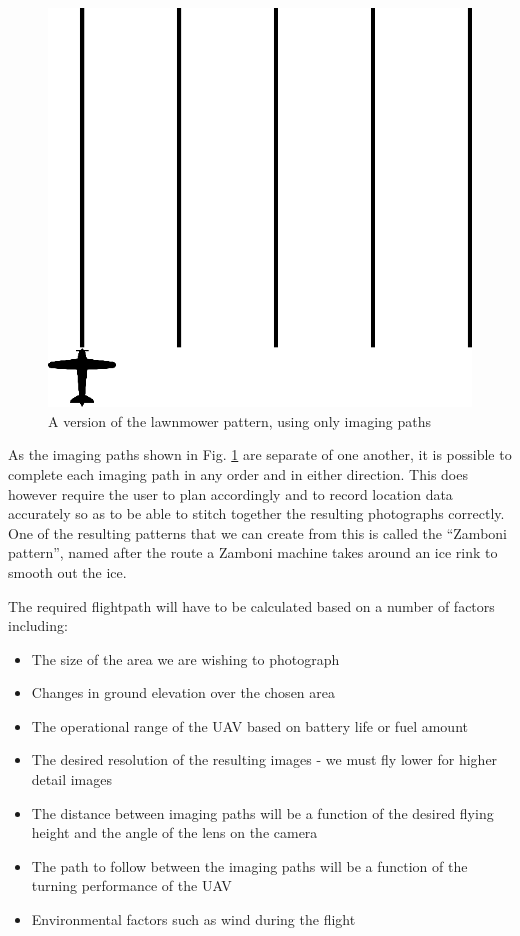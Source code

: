 \begin{figure}[htbp!] 
\centering    
\includegraphics[width=0.5\textheight]{ImagingLawnmower}
\caption[Imaging Lawnmower Pattern]{A version of the lawnmower pattern, using only imaging paths}
\label{fig:imaginglawnmower}
\end{figure}

As the imaging paths shown in Fig. \ref{fig:imaginglawnmower} are separate of one another, it is possible to complete each imaging path in any order and in either direction. This does however require the user to plan accordingly and to record location data accurately so as to be able to stitch together the resulting photographs correctly. One of the resulting patterns that we can create from this is called the ``Zamboni pattern'', named after the route a Zamboni machine takes around an ice rink to smooth out the ice. %

The required flightpath will have to be calculated based on a number of factors including:
\begin{itemize}
	\item The size of the area we are wishing to photograph
	\item Changes in ground elevation over the chosen area
	\item The operational range of the UAV based on battery life or fuel amount
	\item The desired resolution of the resulting images - we must fly lower for higher detail images
	\item The distance between imaging paths will be a function of the desired flying height and the angle of the lens on the camera
	\item The path to follow between the imaging paths will be a function of the turning performance of the UAV
	\item Environmental factors such as wind during the flight
\end{itemize}


